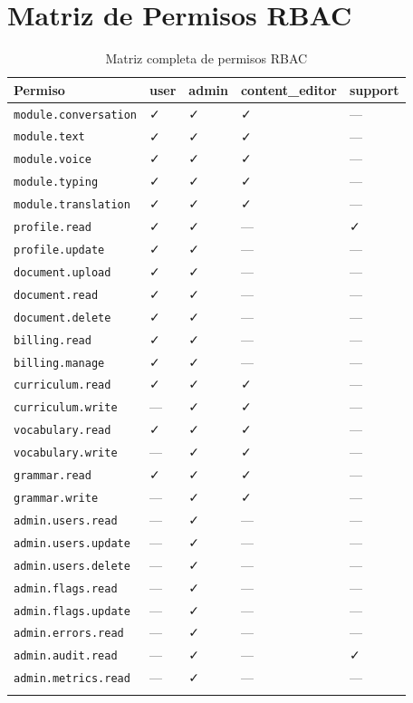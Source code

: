 \chapter{Matriz de Permisos RBAC}
\label{app:rbac-matrix}

\begin{longtable}{p{4.5cm}p{1.5cm}p{1.5cm}p{2cm}p{2cm}}
\toprule
\textbf{Permiso} & \textbf{user} & \textbf{admin} & \textbf{content\_editor} & \textbf{support} \\
\midrule
\endhead
\texttt{module.conversation} & ✓ & ✓ & ✓ & --- \\
\texttt{module.text} & ✓ & ✓ & ✓ & --- \\
\texttt{module.voice} & ✓ & ✓ & ✓ & --- \\
\texttt{module.typing} & ✓ & ✓ & ✓ & --- \\
\texttt{module.translation} & ✓ & ✓ & ✓ & --- \\
\texttt{profile.read} & ✓ & ✓ & --- & ✓ \\
\texttt{profile.update} & ✓ & ✓ & --- & --- \\
\texttt{document.upload} & ✓ & ✓ & --- & --- \\
\texttt{document.read} & ✓ & ✓ & --- & --- \\
\texttt{document.delete} & ✓ & ✓ & --- & --- \\
\texttt{billing.read} & ✓ & ✓ & --- & --- \\
\texttt{billing.manage} & ✓ & ✓ & --- & --- \\
\texttt{curriculum.read} & ✓ & ✓ & ✓ & --- \\
\texttt{curriculum.write} & --- & ✓ & ✓ & --- \\
\texttt{vocabulary.read} & ✓ & ✓ & ✓ & --- \\
\texttt{vocabulary.write} & --- & ✓ & ✓ & --- \\
\texttt{grammar.read} & ✓ & ✓ & ✓ & --- \\
\texttt{grammar.write} & --- & ✓ & ✓ & --- \\
\texttt{admin.users.read} & --- & ✓ & --- & --- \\
\texttt{admin.users.update} & --- & ✓ & --- & --- \\
\texttt{admin.users.delete} & --- & ✓ & --- & --- \\
\texttt{admin.flags.read} & --- & ✓ & --- & --- \\
\texttt{admin.flags.update} & --- & ✓ & --- & --- \\
\texttt{admin.errors.read} & --- & ✓ & --- & --- \\
\texttt{admin.audit.read} & --- & ✓ & --- & ✓ \\
\texttt{admin.metrics.read} & --- & ✓ & --- & --- \\
\bottomrule
\caption{Matriz completa de permisos RBAC}
\end{longtable}

